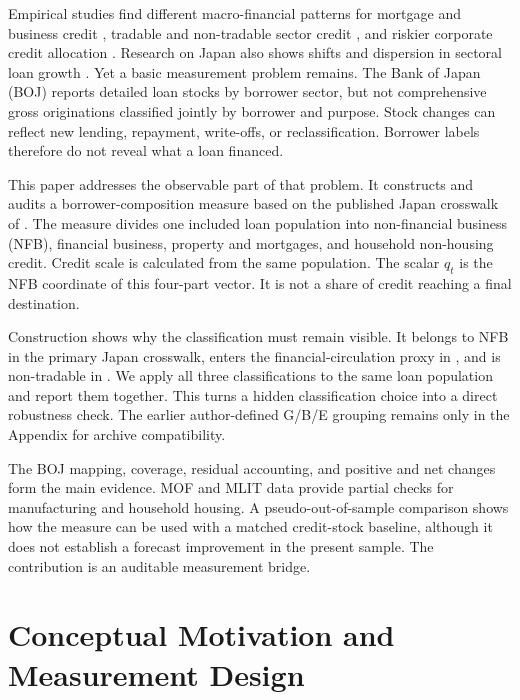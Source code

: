 \documentclass[11pt]{article}
\begin{document}
Empirical studies find different macro-financial patterns for mortgage and
business credit \citep{BezemerSamarinaZhang2020,BezemerZhang2019}, tradable and
non-tradable sector credit
\citep{MullerVerner2024,AndriesOngenaSprincean2025}, and riskier corporate
credit allocation \citep{BrandaoMarquesEtAl2022}. Research on Japan also shows
shifts and dispersion in sectoral loan growth \citep{SaitaSekine2001}. Yet a
basic measurement problem remains. The Bank of Japan (BOJ) reports detailed
loan stocks by borrower sector, but not comprehensive gross originations
classified jointly by borrower and purpose. Stock changes can reflect new
lending, repayment, write-offs, or reclassification. Borrower labels therefore
do not reveal what a loan financed.

This paper addresses the observable part of that problem. It constructs and
audits a borrower-composition measure based on the published Japan crosswalk of
\citet{BezemerSamarinaZhang2020}. The measure divides one included loan
population into non-financial business (NFB), financial business, property and
mortgages, and household non-housing credit. Credit scale is calculated from
the same population. The scalar \(q_t\) is the NFB coordinate of this
four-part vector. It is not a share of credit reaching a final destination.

Construction shows why the classification must remain visible. It belongs to
NFB in the primary Japan crosswalk, enters the financial-circulation proxy in
\citet{Werner1997}, and is non-tradable in \citet{MullerVerner2024}. We apply
all three classifications to the same loan population and report them
together. This turns a hidden classification choice into a direct robustness
check. The earlier author-defined G/B/E grouping remains only in the Appendix
for archive compatibility.

The BOJ mapping, coverage, residual accounting, and positive and net changes
form the main evidence. MOF and MLIT data provide partial checks for
manufacturing and household housing. A pseudo-out-of-sample comparison shows
how the measure can be used with a matched credit-stock baseline, although it
does not establish a forecast improvement in the present sample. The
contribution is an auditable measurement bridge.

\section{Conceptual Motivation and Measurement Design}
\end{document}

